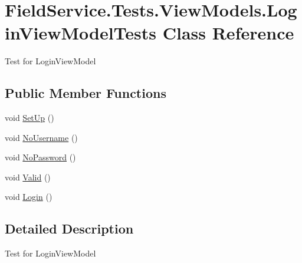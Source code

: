 \hypertarget{class_field_service_1_1_tests_1_1_view_models_1_1_login_view_model_tests}{\section{Field\+Service.\+Tests.\+View\+Models.\+Login\+View\+Model\+Tests Class Reference}
\label{class_field_service_1_1_tests_1_1_view_models_1_1_login_view_model_tests}
}


Test for Login\+View\+Model  


\subsection*{Public Member Functions}
\begin{DoxyCompactItemize}
\item 
void \hyperlink{class_field_service_1_1_tests_1_1_view_models_1_1_login_view_model_tests_a7327f293d785b79b721a5da05fb1e9a2}{Set\+Up} ()
\item 
void \hyperlink{class_field_service_1_1_tests_1_1_view_models_1_1_login_view_model_tests_a29dc14d74b784223a6d617e3b6af3529}{No\+Username} ()
\item 
void \hyperlink{class_field_service_1_1_tests_1_1_view_models_1_1_login_view_model_tests_a4f9a3fa2bdeca2646be0acd12cf0c035}{No\+Password} ()
\item 
void \hyperlink{class_field_service_1_1_tests_1_1_view_models_1_1_login_view_model_tests_a11e73919421ef4937c77829ab3525553}{Valid} ()
\item 
void \hyperlink{class_field_service_1_1_tests_1_1_view_models_1_1_login_view_model_tests_a1be97d5a96db7f59341de6a0efa10d08}{Login} ()
\end{DoxyCompactItemize}


\subsection{Detailed Description}
Test for Login\+View\+Model 



